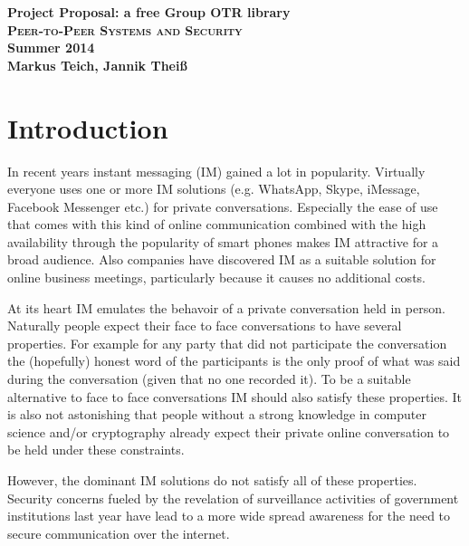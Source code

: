 

\title{}
\author{Markus Teich, Jannik Theiß}
\date{\today}



\begin{center}
\huge \textbf{Project Proposal: a free Group OTR library} \\
\vspace{2cm}
\LARGE\textbf{\textsc{Peer-to-Peer Systems and Security}}\\
\vspace{0.5cm}
\textbf{Summer 2014}\\
\textbf{Markus Teich, Jannik Theiß}
\vspace{3.5cm}
\end{center}


\section{Introduction}

In recent years instant messaging (IM) gained a lot in popularity. Virtually
everyone uses one or more IM solutions (e.g. WhatsApp, Skype, iMessage, Facebook
Messenger etc.) for private conversations. Especially the ease of use that comes
with this kind of online communication combined with the high availability
through the popularity of smart phones makes IM attractive for a broad audience.
Also companies have discovered IM as a suitable solution for online business
meetings, particularly because it causes no additional costs.

At its heart IM emulates the behavoir of a private conversation held in person.
Naturally people expect their face to face conversations to have several
properties. For example for any party that did not participate the conversation
the (hopefully) honest word of the participants is the only proof of what was
said during the conversation (given that no one recorded it). To be a suitable
alternative to face to face conversations IM should also satisfy these
properties. It is also not astonishing that people without a strong knowledge in
computer science and/or cryptography already expect their private online
conversation to be held under these constraints.

However, the dominant IM solutions do not satisfy all of these properties.
Security concerns fueled by the revelation of surveillance activities of
government institutions last year have lead to a more wide spread awareness for
the need to secure communication over the internet.


